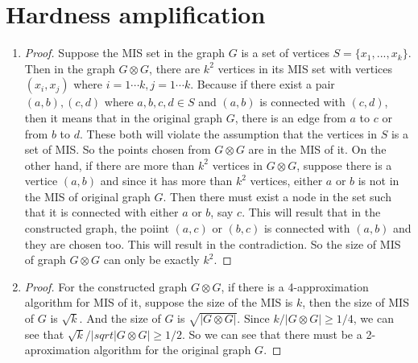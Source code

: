 \documentclass{article}
\begin{document}
	\section{Hardness amplification}
		\begin{enumerate}
			\item \begin{proof}
				Suppose the MIS set in the graph $G$ is a set of vertices $S = \{x_1, ..., x_k\}$. Then in the graph $G \otimes G$, there are $k^2$ vertices in its MIS set with vertices $(x_i, x_j)$ where $i = 1\cdots k, j = 1\cdots k$. Because if there exist a pair $(a, b), (c, d)$ where $a, b, c, d \in S$ and $(a, b)$ is connected with $(c,d)$, then it means that in the original graph $G$, there is an edge from $a$ to $c$ or from $b$ to $d$. These both will violate the assumption that the vertices in $S$ is a set of MIS. So the points chosen from $G \otimes G$ are in the MIS of it. On the other hand, if there are more than $k^2$ vertices in $G \otimes G$, suppose there is a vertice $(a, b)$ and since it has more than $k^2$ vertices, either $a$ or $b$ is not in the MIS of original graph $G$. Then there must exist a node in the set such that it is connected with either $a$ or $b$, say $c$. This will result that in the constructed graph, the poiint $(a, c)$ or $(b, c)$ is connected with $(a, b)$ and they are chosen too. This will result in the contradiction. So the size of MIS of graph $G \otimes G$ can only be exactly $k^2$. \end{proof}
			\item \begin{proof} For the constructed graph $G \otimes G$, if there is a 4-approximation algorithm for MIS of it, suppose the size of the MIS is $k$, then the size of MIS of $G$ is $\sqrt{k}$. And the size of $G$ is $\sqrt{|G \otimes G|}$. Since $k / |G \otimes G| \geq 1/4 $, we can see that $\sqrt{k} / |sqrt{|G \otimes G|} \geq 1/2$. So we can see that there must be a 2-aproximation algorithm for the original graph $G$. \end{proof}
		\end{enumerate}
\end{document}
